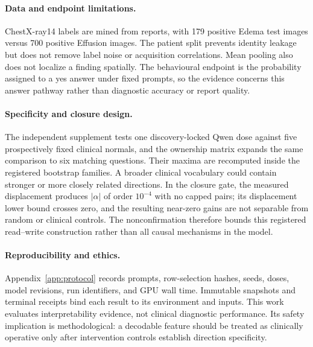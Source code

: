 \paragraph{Data and endpoint limitations.}
ChestX-ray14 labels are mined from reports, with 179 positive Edema test images versus 700 positive Effusion images. The patient split prevents identity leakage but does not remove label noise or acquisition correlations. Mean pooling also does not localize a finding spatially. The behavioural endpoint is the probability assigned to a yes answer under fixed prompts, so the evidence concerns this answer pathway rather than diagnostic accuracy or report quality.

\paragraph{Specificity and closure design.}
The independent supplement tests one discovery-locked Qwen dose against five prospectively fixed clinical normals, and the ownership matrix expands the same comparison to six matching questions. Their maxima are recomputed inside the registered bootstrap families. A broader clinical vocabulary could contain stronger or more closely related directions. In the closure gate, the measured displacement produces $|\alpha|$ of order $10^{-4}$ with no capped pairs; its displacement lower bound crosses zero, and the resulting near-zero gains are not separable from random or clinical controls. The nonconfirmation therefore bounds this registered read--write construction rather than all causal mechanisms in the model.

\paragraph{Reproducibility and ethics.}
Appendix~\ref{app:protocol} records prompts, row-selection hashes, seeds, doses, model revisions, run identifiers, and GPU wall time. Immutable snapshots and terminal receipts bind each result to its environment and inputs. This work evaluates interpretability evidence, not clinical diagnostic performance. Its safety implication is methodological: a decodable feature should be treated as clinically operative only after intervention controls establish direction specificity.
